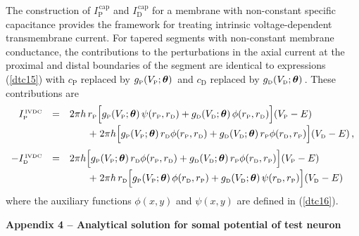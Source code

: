 The construction of $I^\mathrm{\,cap}_\mathrm{P}$ and
$I^\mathrm{\,cap}_\mathrm{D}$ for a membrane with non-constant
specific capacitance provides the framework for treating intrinsic
voltage-dependent transmembrane current. For tapered segments with
non-constant membrane conductance, the contributions to the
perturbations in the axial current at the proximal and distal
boundaries of the segment are identical to expressions
(\ref{dtc15}) with $c_\mathrm{P}$ replaced by
$g_{\mbox{\tiny P}}(V_{\mbox{\tiny P}};\boldsymbol{\theta})\,$ and $c_\mathrm{D}$
replaced by $g_{\mbox{\tiny D}}(V_{\mbox{\tiny D}};\boldsymbol{\theta})\,$. These
contributions are
\begin{equation}\label{dtc19}
\begin{array}{rcl}
I^{\mbox{\tiny \,IVDC}}_{\mbox{\tiny P}} & = & 2\pi h
\,r_{\mbox{\tiny P}}\Big[g_{\mbox{\tiny P}}(V_{\mbox{\tiny P}};\boldsymbol{\theta})\,\psi(r_{\mbox{\tiny P}},r_{\mbox{\tiny D}})
+g_{\mbox{\tiny D}}(V_{\mbox{\tiny D}};\boldsymbol{\theta})\,\phi(r_{\mbox{\tiny P}},r_{\mbox{\tiny D}})\Big]
(V_{\mbox{\tiny P}}-E)\\[5pt]
&&\qquad+\;2\pi
h\Big[g_{\mbox{\tiny P}}(V_{\mbox{\tiny P}};\boldsymbol{\theta})\,r_{\mbox{\tiny D}}
\phi(r_{\mbox{\tiny P}},r_{\mbox{\tiny D}})+g_{\mbox{\tiny D}}(V_{\mbox{\tiny D}};\boldsymbol{\theta})\,r_{\mbox{\tiny P}}
\phi(r_{\mbox{\tiny D}},r_{\mbox{\tiny P}})\Big](V_{\mbox{\tiny D}}-E)\,,\\[10pt]
-I^{\mbox{\tiny \,IVDC}}_{\mbox{\tiny D}} & = & 2\pi h
\Big[g_{\mbox{\tiny P}}(V_{\mbox{\tiny P}};\boldsymbol{\theta})\,r_{\mbox{\tiny D}}\phi(r_{\mbox{\tiny P}},r_{\mbox{\tiny D}})
+g_{\mbox{\tiny D}}(V_{\mbox{\tiny D}};\boldsymbol{\theta})\,r_{\mbox{\tiny P}}\phi(r_{\mbox{\tiny D}},r_{\mbox{\tiny P}})\Big]
(V_{\mbox{\tiny P}}-E)\\[5pt]
&&\qquad+\;2\pi
h\,r_{\mbox{\tiny D}}\Big[g_{\mbox{\tiny P}}(V_{\mbox{\tiny P}};\boldsymbol{\theta})\,
\phi(r_{\mbox{\tiny D}},r_{\mbox{\tiny P}})+g_{\mbox{\tiny D}}(V_{\mbox{\tiny D}};\boldsymbol{\theta})\,
\psi(r_{\mbox{\tiny D}},r_{\mbox{\tiny P}})\Big](V_{\mbox{\tiny D}}-E)
\end{array}
\end{equation}
where the auxiliary functions $\phi(x,y)$ and $\psi(x,y)$ are
defined in (\ref{dtc16}).

\textbf{Appendix 4 -- Analytical solution for somal potential of
test neuron}


